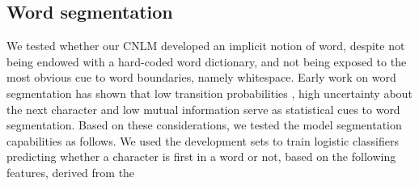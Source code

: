 \subsection{Word segmentation}
\label{sec:segmentation}

We tested whether our CNLM developed an implicit notion of word, despite not being endowed with a hard-coded word dictionary, and not being exposed to the most obvious cue to word boundaries, namely whitespace. %
Early work on word segmentation has shown that low transition
probabilities \cite{harris-distributional-1954, saffran-word-1996},
high uncertainty about the next character \cite{cohen-algorithm-2001,
  feng-accessor-2004} and low mutual information
\cite{sun-chinese-1998} serve as statistical cues to word
segmentation.  %
%
%
Based on these considerations, we tested the model segmentation
capabilities as follows. We used the development sets to
train  logistic classifiers predicting whether a character is first in
a word or not, based on the following features, derived from the
